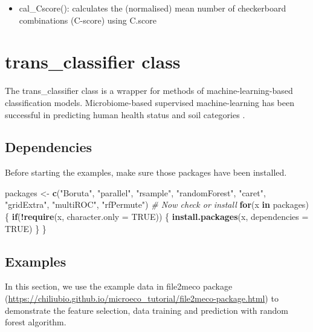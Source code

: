 \documentclass[
]{book}
\newenvironment{Shaded}{\begin{snugshade}}{\end{snugshade}}
\newcommand{\AttributeTok}[1]{\textcolor[rgb]{0.13,0.29,0.53}{#1}}
\newcommand{\CommentTok}[1]{\textcolor[rgb]{0.56,0.35,0.01}{\textit{#1}}}
\newcommand{\ConstantTok}[1]{\textcolor[rgb]{0.56,0.35,0.01}{#1}}
\newcommand{\ControlFlowTok}[1]{\textcolor[rgb]{0.13,0.29,0.53}{\textbf{#1}}}
\newcommand{\FunctionTok}[1]{\textcolor[rgb]{0.13,0.29,0.53}{\textbf{#1}}}
\newcommand{\NormalTok}[1]{#1}
\newcommand{\OtherTok}[1]{\textcolor[rgb]{0.56,0.35,0.01}{#1}}
\newcommand{\SpecialCharTok}[1]{\textcolor[rgb]{0.81,0.36,0.00}{\textbf{#1}}}
\newcommand{\StringTok}[1]{\textcolor[rgb]{0.31,0.60,0.02}{#1}}
\providecommand{\tightlist}{%
  \setlength{\itemsep}{0pt}\setlength{\parskip}{0pt}}
\begin{document}
\begin{itemize}
\tightlist
\item
  cal\_Cscore(): calculates the (normalised) mean number of checkerboard combinations (C-score) using C.score
\end{itemize}

\section{trans\_classifier class}\label{trans_classifier-class}

The trans\_classifier class is a wrapper for methods of machine-learning-based classification models.
Microbiome-based supervised machine-learning has been successful in predicting human health status \citep{Poore_Microbiome_2020}
and soil categories \citep{Wilhelm_Predicting_2021}.

\subsection{Dependencies}\label{dependencies}

Before starting the examples, make sure those packages have been installed.

\begin{Shaded}
\begin{Highlighting}[]
\NormalTok{packages }\OtherTok{\textless{}{-}} \FunctionTok{c}\NormalTok{(}\StringTok{"Boruta"}\NormalTok{, }\StringTok{"parallel"}\NormalTok{, }\StringTok{"rsample"}\NormalTok{, }\StringTok{"randomForest"}\NormalTok{, }\StringTok{"caret"}\NormalTok{, }\StringTok{"gridExtra"}\NormalTok{, }\StringTok{"multiROC"}\NormalTok{, }\StringTok{"rfPermute"}\NormalTok{)}
\CommentTok{\# Now check or install}
\ControlFlowTok{for}\NormalTok{(x }\ControlFlowTok{in}\NormalTok{ packages)\{}
    \ControlFlowTok{if}\NormalTok{(}\SpecialCharTok{!}\FunctionTok{require}\NormalTok{(x, }\AttributeTok{character.only =} \ConstantTok{TRUE}\NormalTok{)) \{}
        \FunctionTok{install.packages}\NormalTok{(x, }\AttributeTok{dependencies =} \ConstantTok{TRUE}\NormalTok{)}
\NormalTok{    \}}
\NormalTok{\}}
\end{Highlighting}
\end{Shaded}

\subsection{Examples}\label{examples}

In this section, we use the example data in file2meco package (\url{https://chiliubio.github.io/microeco_tutorial/file2meco-package.html}) to demonstrate the feature selection,
data training and prediction with random forest algorithm.
\end{document}
